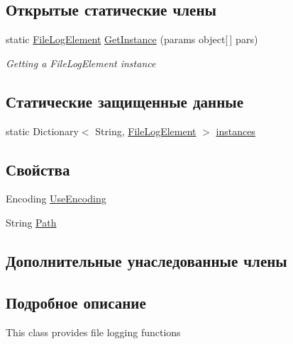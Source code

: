 \subsection*{Открытые статические члены}
\begin{DoxyCompactItemize}
\item 
static \hyperlink{class_logger_1_1_file_log_element}{File\+Log\+Element} \hyperlink{class_logger_1_1_file_log_element_a75b9c7ef3c4e5d5208666ce643a9279e}{Get\+Instance} (params object\mbox{[}$\,$\mbox{]} pars)
\begin{DoxyCompactList}\small\item\em Getting a File\+Log\+Element instance \end{DoxyCompactList}\end{DoxyCompactItemize}
\subsection*{Статические защищенные данные}
\begin{DoxyCompactItemize}
\item 
static Dictionary$<$ String, \hyperlink{class_logger_1_1_file_log_element}{File\+Log\+Element} $>$ \hyperlink{class_logger_1_1_file_log_element_af0766c885340c7b7efd913e6c0506da9}{instances}
\end{DoxyCompactItemize}
\subsection*{Свойства}
\begin{DoxyCompactItemize}
\item 
Encoding \hyperlink{class_logger_1_1_file_log_element_a117b230e3fdc8707b3d9291d46627a74}{Use\+Encoding}
\item 
String \hyperlink{class_logger_1_1_file_log_element_acaa405b2fa63d634684900980a2b7821}{Path}
\end{DoxyCompactItemize}
\subsection*{Дополнительные унаследованные члены}


\subsection{Подробное описание}
This class provides file logging functions 



